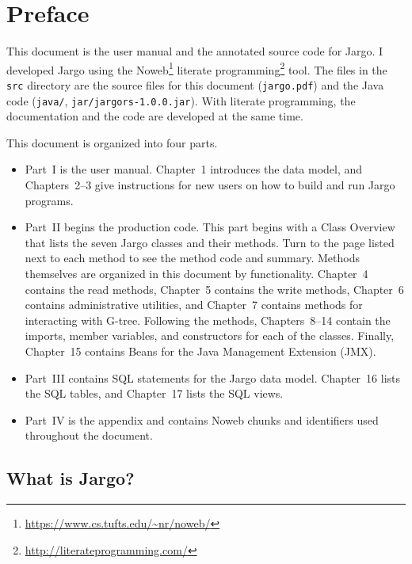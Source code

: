 \chapter*{Preface}
\label{preface}


This document is the user manual and the annotated source code for Jargo. I
developed Jargo using the
Noweb\footnote{\url{https://www.cs.tufts.edu/~nr/noweb/}} literate
programming\footnote{\url{http://literateprogramming.com/}} tool. The files in
the {\tt{}src} directory are the source files for this document ({\tt{}jargo.pdf})
and the Java code ({\tt{}java/}, {\tt{}jar/jargors-1.0.0.jar}). With literate
programming, the documentation and the code are developed at the same time.

This document is organized into four parts.
\begin{itemize}
\item Part~I is the user manual. Chapter~1 introduces the data model, and
Chapters~2--3 give instructions for new users on how to build and run Jargo
programs.
\item Part~II begins the production code. This part begins with a Class
Overview that lists the seven Jargo classes and their methods. Turn to the
page listed next to each method to see the method code and summary. Methods
themselves are organized in this document by functionality. Chapter~4
contains the read methods, Chapter~5 contains the write methods,
Chapter~6 contains administrative utilities, and Chapter~7 contains
methods for interacting with G-tree. Following the methods, Chapters~8--14
contain the imports, member variables, and constructors for each of the classes.
Finally, Chapter~15 contains Beans for the Java Management Extension (JMX).
\item Part~III contains SQL statements for the Jargo data model. Chapter~16
lists the SQL tables, and Chapter~17 lists the SQL views.
\item Part~IV is the appendix and contains Noweb chunks and identifiers used
throughout the document.
\end{itemize}

\section*{What is Jargo?}

